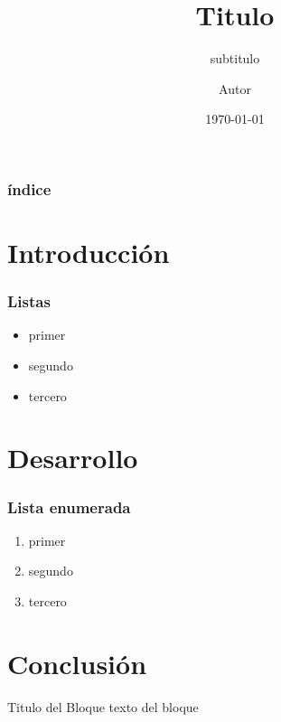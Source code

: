 \documentclass{beamer}
\title{Titulo}
\subtitle{subtitulo}
\author{Autor}
\date{\today}
\begin{document}
	\begin{frame}
		\titlepage
	\end{frame}
	\begin{frame}
		\frametitle{índice}
		\tableofcontents
	\end{frame}
	
	\section{Introducción}
	
	\begin{frame}
	 \frametitle{Listas}
	 \begin{itemize}
	  \item primer \pause
	  \item segundo \pause
	  \item tercero \pause
	 \end{itemize}
	\end{frame}
	
	\section{Desarrollo}
	
	\begin{frame}
	\frametitle{Lista enumerada}
		\begin{enumerate}[<+->]
			\item primer
			\item segundo
			\item tercero
		\end{enumerate}
	\end{frame}
	
	\section{Conclusión}
	\begin{frame}
		\begin{block}{Titulo del Bloque}
			texto del bloque		
		\end{block}
	\end{frame}
\end{document}

